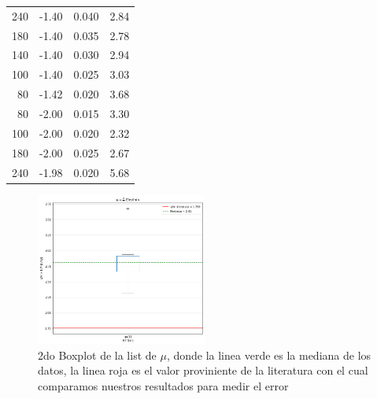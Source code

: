 \documentclass[a4paper,twocolumn,10pt]{article}
\begin{document}
\begin{table}
\begin{tabular}{rrrr}
240                                                         & -1.40                             & 0.040                         & 2.84                              \\
180                                                         & -1.40                             & 0.035                         & 2.78                              \\
140                                                         & -1.40                             & 0.030                         & 2.94                              \\
100                                                         & -1.40                             & 0.025                         & 3.03                              \\
80                                                          & -1.42                             & 0.020                         & 3.68                              \\
80                                                          & -2.00                             & 0.015                         & 3.30                              \\
100                                                         & -2.00                             & 0.020                         & 2.32                              \\
180                                                         & -2.00                             & 0.025                         & 2.67                              \\
240                                                         & -1.98                             & 0.020                         & 5.68                             
\end{tabular}
\end{table}


\begin{figure}[H]
    \centering
    \includegraphics[width=0.5\textwidth]{PlotQM/dispersion_sin_outliers.png}
    \caption{2do Boxplot de la list de $\mu$, donde la linea verde es la mediana de los datos, la linea roja es el valor proviniente de la literatura con el cual comparamos nuestros resultados para medir el error}
    \label{fig:qmboxplot_noo}
\end{figure}
\end{document}
